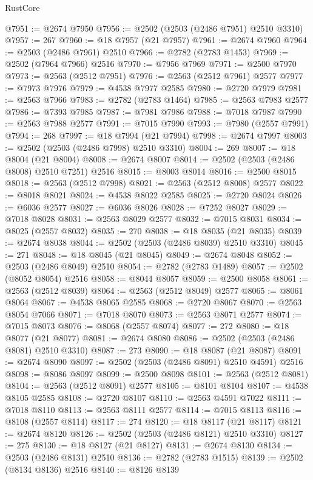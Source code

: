 \begin{lexlean}{RustCore}
\begin{coremodule}
@7951 := @2674 @7950
@7956 := @2502 (@2503 (@2486 @7951) @2510 @3310)
@7957 := 267
@7960 := @18 @7957 (@21 @7957)
@7961 := @2674 @7960
@7964 := @2503 (@2486 @7961) @2510
@7966 := @2782 (@2783 @1453)
@7969 := @2502 (@7964 @7966) @2516
@7970 := @7956 @7969
@7971 := @2500 @7970
@7973 := @2563 (@2512 @7951)
@7976 := @2563 (@2512 @7961) @2577
@7977 := @7973 @7976
@7979 := @4538 @7977 @2585
@7980 := @2720 @7979
@7981 := @2563 @7966
@7983 := @2782 (@2783 @1464)
@7985 := @2563 @7983 @2577
@7986 := @7393 @7985
@7987 := @7981 @7986
@7988 := @7018 @7987
@7990 := @2563 @7988 @2577
@7991 := @7015 @7990
@7993 := @7980 (@2557 @7991)
@7994 := 268
@7997 := @18 @7994 (@21 @7994)
@7998 := @2674 @7997
@8003 := @2502 (@2503 (@2486 @7998) @2510 @3310)
@8004 := 269
@8007 := @18 @8004 (@21 @8004)
@8008 := @2674 @8007
@8014 := @2502 (@2503 (@2486 @8008) @2510 @7251) @2516
@8015 := @8003 @8014
@8016 := @2500 @8015
@8018 := @2563 (@2512 @7998)
@8021 := @2563 (@2512 @8008) @2577
@8022 := @8018 @8021
@8024 := @4538 @8022 @2585
@8025 := @2720 @8024
@8026 := @6036 @2577
@8027 := @6036 @8026
@8028 := @7252 @8027
@8029 := @7018 @8028
@8031 := @2563 @8029 @2577
@8032 := @7015 @8031
@8034 := @8025 (@2557 @8032)
@8035 := 270
@8038 := @18 @8035 (@21 @8035)
@8039 := @2674 @8038
@8044 := @2502 (@2503 (@2486 @8039) @2510 @3310)
@8045 := 271
@8048 := @18 @8045 (@21 @8045)
@8049 := @2674 @8048
@8052 := @2503 (@2486 @8049) @2510
@8054 := @2782 (@2783 @1489)
@8057 := @2502 (@8052 @8054) @2516
@8058 := @8044 @8057
@8059 := @2500 @8058
@8061 := @2563 (@2512 @8039)
@8064 := @2563 (@2512 @8049) @2577
@8065 := @8061 @8064
@8067 := @4538 @8065 @2585
@8068 := @2720 @8067
@8070 := @2563 @8054 @7066
@8071 := @7018 @8070
@8073 := @2563 @8071 @2577
@8074 := @7015 @8073
@8076 := @8068 (@2557 @8074)
@8077 := 272
@8080 := @18 @8077 (@21 @8077)
@8081 := @2674 @8080
@8086 := @2502 (@2503 (@2486 @8081) @2510 @3310)
@8087 := 273
@8090 := @18 @8087 (@21 @8087)
@8091 := @2674 @8090
@8097 := @2502 (@2503 (@2486 @8091) @2510 @4591) @2516
@8098 := @8086 @8097
@8099 := @2500 @8098
@8101 := @2563 (@2512 @8081)
@8104 := @2563 (@2512 @8091) @2577
@8105 := @8101 @8104
@8107 := @4538 @8105 @2585
@8108 := @2720 @8107
@8110 := @2563 @4591 @7022
@8111 := @7018 @8110
@8113 := @2563 @8111 @2577
@8114 := @7015 @8113
@8116 := @8108 (@2557 @8114)
@8117 := 274
@8120 := @18 @8117 (@21 @8117)
@8121 := @2674 @8120
@8126 := @2502 (@2503 (@2486 @8121) @2510 @3310)
@8127 := 275
@8130 := @18 @8127 (@21 @8127)
@8131 := @2674 @8130
@8134 := @2503 (@2486 @8131) @2510
@8136 := @2782 (@2783 @1515)
@8139 := @2502 (@8134 @8136) @2516
@8140 := @8126 @8139

\end{coremodule}
\end{lexlean}
